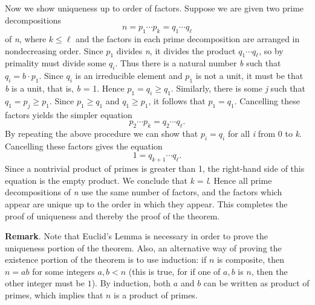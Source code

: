 \documentclass[12pt]{article}
\newcommand{\fm}[1]{{\it #1}}
\begin{document}
\begin{description}
Now we show uniqueness up to order of factors.  Suppose we are given
two prime decompositions
\[
  n = p_1 \cdots p_k = q_1 \cdots q_{\ell}
\]
of \fm{n}, where $k\le\ell$ and the factors in each prime decomposition
are arranged in nondecreasing order.  Since $p_1$ divides \fm{n}, it
divides the product $q_1 \cdots q_{\ell}$, so by primality must divide
some $q_i$.  Thus there is a natural number \fm{b} such that $q_i =
b\cdot p_1$.  Since $q_i$ is an irreducible element and $p_1$ is not a
unit, it must be that \fm{b} is a unit, that is, \fm{b} = 1.  Hence
$p_1 = q_i \ge q_1$.  Similarly, there is some \fm{j} such that $q_1 =
p_j \ge p_1$.  Since $p_1 \ge q_1$ and $q_1 \ge p_1$, it follows that
$p_1 = q_1$.  Cancelling these factors yields the simpler equation
\[
  p_2 \cdots p_k = q_2 \cdots q_{\ell}.
\]
By repeating the above procedure we can show that $p_i = q_i$ for all
\fm{i} from 0 to \fm{k}.  Cancelling these factors gives the equation
\[
  1 = q_{k+1} \cdots q_{\ell}.
\]
Since a nontrivial product of primes is greater than 1, the right-hand
side of this equation is the empty product.  We conclude that \fm{k} =
\fm{l}.  Hence all prime decompositions of \fm{n} use the same number
of factors, and the factors which appear are unique up to the order in
which they appear.  This completes the proof of uniqueness and thereby
the proof of the theorem.

\end{description}

\textbf{Remark}.  Note that Euclid's Lemma is necessary in order to prove the uniqueness portion of the theorem.  Also, an alternative way of proving the existence portion of the theorem is to use induction: if $n$ is composite, then $n=ab$ for some integers $a,b<n$ (this is true, for if one of $a,b$ is $n$, then the other integer must be $1$).  By induction, both $a$ and $b$ can be written as product of primes, which implies that $n$ is a product of primes.

\end{document}
